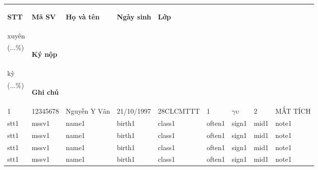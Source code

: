 \documentclass[14pt,a4paper]{article}
\begin{document}
\begin{tabular}{ m{0.7cm} | m{2cm}| m{4cm} | m{2cm} | m{2.5cm} | m{1.2cm} | m{1.5cm} | m{1cm} | m{1.6cm} | }
		\toprule[0.4mm]
		\begin{center}\textbf{STT }\end{center}&\begin{center}\textbf{Mã SV}\end{center} &\begin{center}\textbf{Họ và tên}\end{center} &\begin{center} \textbf{Ngày sinh}\end{center} &\begin{center} \textbf{Lớp}\end{center} &\vspace{-0.2cm}\begin{center} \textbf{Thường\vspace{-0.2cm}\\xuyên\vspace{-0.2cm}\\(...\%)\vspace{-0.6cm} }\end{center} & \begin{center} \textbf{Ký nộp }\end{center}&\vspace{-0.2cm}\begin{center} \textbf{Giữa\vspace{-0.2cm}\\kỳ\vspace{-0.2cm}\\(...\%)\vspace{-0.6cm} }\end{center} &\begin{center} \textbf{Ghi chú}\vspace{-0cm}\end{center}\\
		\hline
		1 & 12345678 & Nguyễn Y Vân & 21/10/1997 & 28CLCMTTT & 1 & $ \gamma\upsilon $ & 2 & MẤT TÍCH\\
		\hline
		stt1 & mssv1 & name1 & birth1 & class1 & often1 & sign1 & mid1 & note1\\
		\hline
		stt1 & mssv1 & name1 & birth1 & class1 & often1 & sign1 & mid1 & note1\\
		\hline
		stt1 & mssv1 & name1 & birth1 & class1 & often1 & sign1 & mid1 & note1\\
		\hline
		stt1 & mssv1 & name1 & birth1 & class1 & often1 & sign1 & mid1 & note1\\

\end{tabular}
\end{document}
